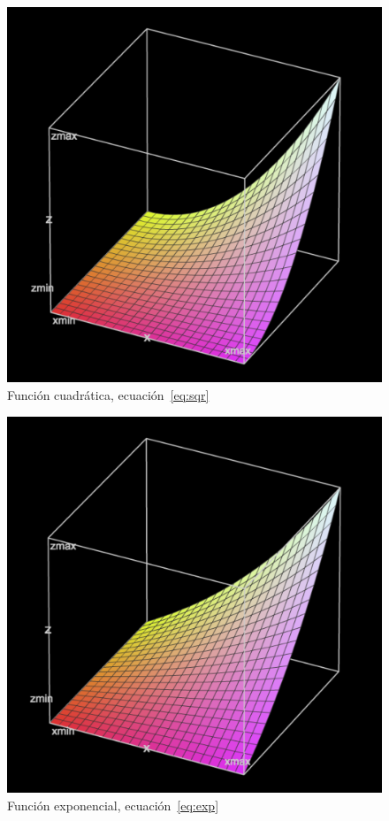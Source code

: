 \documentclass{ci5652}
\begin{document}
\begin{figure}[p]
    \centering
    \includegraphics[width=0.8\linewidth]{squared-3b}
    \caption{Función cuadrática, ecuación~\ref{eq:sqr}}
    \label{fig:squared3}
\end{figure}

\begin{figure}[p]
    \centering
    \includegraphics[width=0.8\linewidth]{euler-3b}
    \caption{Función exponencial, ecuación~\ref{eq:exp}}
    \label{fig:euler3}
\end{figure}
\end{document}
